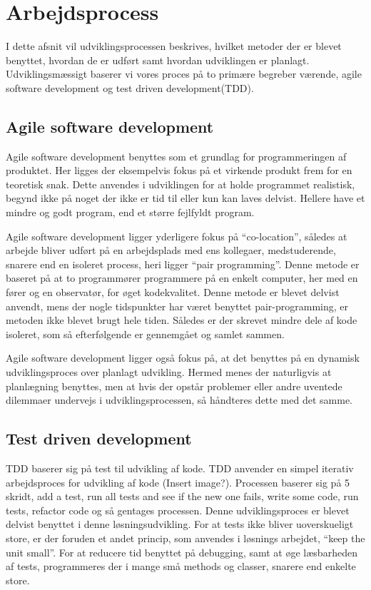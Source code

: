 \chapter{Arbejdsprocess}

I dette afsnit vil udviklingsprocessen beskrives, hvilket metoder der er blevet benyttet, hvordan de er udført samt hvordan udviklingen er planlagt. Udviklingsmæssigt baserer vi vores proces på to primære begreber værende, agile software development og test driven development(TDD).

\section{Agile software development}
Agile software development benyttes som et grundlag for programmeringen af produktet. 
Her ligges der eksempelvis fokus på et virkende produkt frem for en teoretisk snak. 
Dette anvendes i udviklingen for at holde programmet realistisk, begynd ikke på noget der ikke er tid til eller kun kan laves delvist. 
Hellere have et mindre og godt program, end et større fejlfyldt program.

Agile software development ligger yderligere fokus på ``co-location'', således at arbejde bliver udført på en arbejdsplads med ens kollegaer, medstuderende, snarere end en isoleret process, heri ligger ``pair programming''. Denne metode er baseret på at to programmører programmere på en enkelt computer, her med en fører og en observatør, for øget kodekvalitet. Denne metode er blevet delvist anvendt, mens der nogle tidspunkter har været benyttet pair-programming, er metoden ikke blevet brugt hele tiden. Således er der skrevet mindre dele af kode isoleret, som så efterfølgende er gennemgået og samlet sammen.

Agile software development ligger også fokus på, at det benyttes på en dynamisk udviklingsproces over planlagt udvikling. Hermed menes der naturligvis at planlægning  benyttes, men at hvis der opstår problemer eller andre uventede dilemmaer undervejs i udviklingsprocessen, så håndteres dette med det samme.

\section{Test driven development}
TDD baserer sig på test til udvikling af kode. TDD anvender en simpel iterativ arbejdsproces for udvikling af kode (Insert image?). Processen baserer sig på 5 skridt, add a test, run all tests and see if the new one fails, write some code, run tests, refactor code og så gentages processen. Denne udviklingsproces er blevet delvist benyttet i denne løsningsudvikling. For at tests ikke bliver uoverskueligt store, er der foruden et andet princip, som anvendes i løsnings arbejdet, ``keep the unit small''. For at reducere tid benyttet på debugging, samt at øge læsbarheden af tests, programmeres der i mange små methods og classer, snarere end enkelte store.
